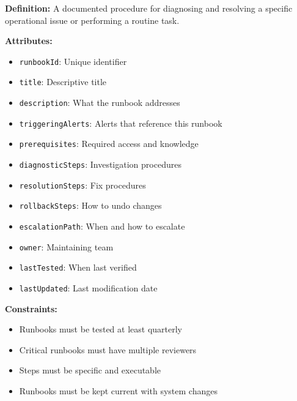 \documentclass[11pt,letterpaper]{article}
\begin{document}
\begin{definitionbox}
\textbf{Definition:} A documented procedure for diagnosing and resolving a specific operational issue or performing a routine task.

\textbf{Attributes:}
\begin{itemize}[nosep]
    \item \texttt{runbookId}: Unique identifier
    \item \texttt{title}: Descriptive title
    \item \texttt{description}: What the runbook addresses
    \item \texttt{triggeringAlerts}: Alerts that reference this runbook
    \item \texttt{prerequisites}: Required access and knowledge
    \item \texttt{diagnosticSteps}: Investigation procedures
    \item \texttt{resolutionSteps}: Fix procedures
    \item \texttt{rollbackSteps}: How to undo changes
    \item \texttt{escalationPath}: When and how to escalate
    \item \texttt{owner}: Maintaining team
    \item \texttt{lastTested}: When last verified
    \item \texttt{lastUpdated}: Last modification date
\end{itemize}

\textbf{Constraints:}
\begin{itemize}[nosep]
    \item Runbooks must be tested at least quarterly
    \item Critical runbooks must have multiple reviewers
    \item Steps must be specific and executable
    \item Runbooks must be kept current with system changes
\end{itemize}
\end{definitionbox}
\end{document}
